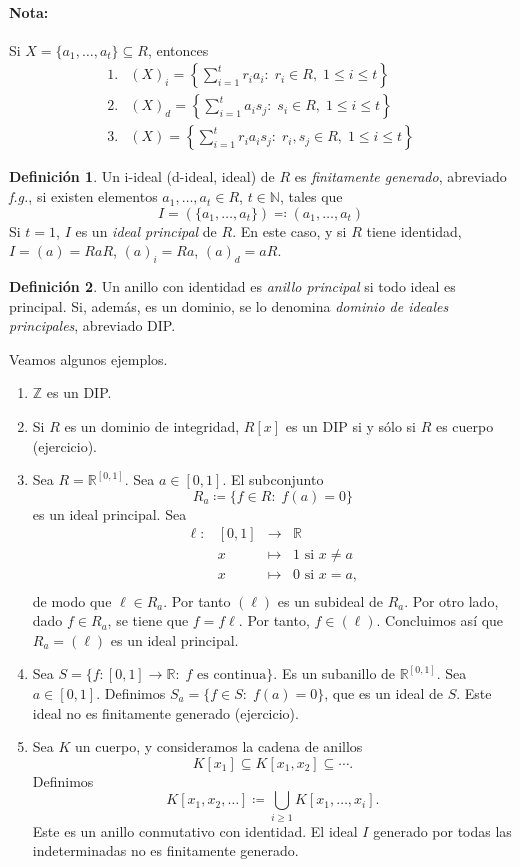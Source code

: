 \documentclass[11pt]{book}
\def\N{\mathbb{N}}
\def\R{\mathbb{R}}
\def\Z{\mathbb{Z}}
\theoremstyle{definition}
\newtheorem{definition}{Definición}[section]
\begin{document}
\paragraph{Nota:}Si $X=\{a_1,\dots,a_t\}\subseteq R$, entonces\[
\begin{array}{ll}
    1. & (X)_i=\left\{\sum_{i=1}^t r_ia_i:\; r_i\in R,\; 1\leq i\leq t\right\}\\
    2. & (X)_d=\left\{\sum_{i=1}^t a_is_j:\; s_i\in R,\; 1\leq i\leq t\right\}\\
    3. & (X)=\left\{\sum_{i=1}^t r_ia_is_j:\; r_i,s_j\in R,\; 1\leq i\leq t\right\}
\end{array}
\]
\begin{definition}
    Un i-ideal (d-ideal, ideal) de $R$ es \textit{finitamente generado}, abreviado \textit{f.g.}, si existen elementos $a_1,\dots,a_t\in R$, $t\in \N$, tales que\[
    I=(\{a_1,\dots,a_t\})\eqqcolon(a_1,\dots,a_t)
    \]Si $t=1$, $I$ es un \textit{ideal principal} de $R$. En este caso, y si $R$ tiene identidad, $I=(a)=RaR$, $(a)_i=Ra$, $(a)_d=aR$.
\end{definition}
\begin{definition}
    Un anillo con identidad es \textit{anillo principal} si todo ideal es principal. Si, además, es un dominio, se lo denomina \textit{dominio de ideales principales}, abreviado DIP.
\end{definition}Veamos algunos ejemplos.\begin{enumerate}
    \item $\Z$ es un DIP.
    \item Si $R$ es un dominio de integridad, $R[x]$ es un DIP si y sólo si $R$ es cuerpo (ejercicio).
    \item Sea $R=\R^{[0,1]}$. Sea $a\in[0,1]$. El subconjunto\[
    R_a\coloneq \{f\in R:\; f(a)=0\}
    \]es un ideal principal. Sea\[
    \begin{array}{rlcl}
        \ell:&[0,1]&\longrightarrow &\R\\
        & x & \longmapsto & 1\text{ si }x\neq a\\
        & x & \longmapsto & 0\text{ si }x= a,\\
    \end{array}
    \]de modo que $\ell\in R_a$. Por tanto $(\ell)$ es un subideal de $R_a$. Por otro lado, dado $f\in R_a$, se tiene que $f=f\ell$. Por tanto, $f\in(\ell)$. Concluimos así que $R_a=(\ell)$ es un ideal principal.
    \item Sea $S=\{f:[0,1]\longrightarrow \R:\; f\text{ es continua}\}$. Es un subanillo de $\R^{[0,1]}$. Sea $a\in[0,1]$. Definimos $S_a=\{f\in S:\; f(a)=0\}$, que es un ideal de $S$. Este ideal no es finitamente generado (ejercicio).
    \item Sea $K$ un cuerpo, y consideramos la cadena de anillos\[
    K[x_1]\subseteq K[x_1,x_2]\subseteq\cdots.
    \]Definimos\[
    K[x_1,x_2,\dots]\coloneq\bigcup_{i\geq 1}K[x_1,\dots,x_i].
    \]Este es un anillo conmutativo con identidad. El ideal $I$ generado por todas las indeterminadas no es finitamente generado.
\end{enumerate}
\end{document}
